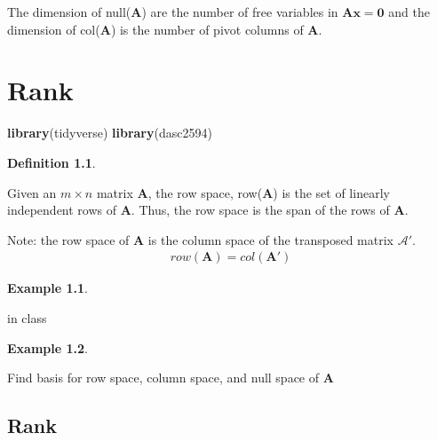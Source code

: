 \documentclass[
]{book}
\newenvironment{Shaded}{\begin{snugshade}}{\end{snugshade}}
\newcommand{\KeywordTok}[1]{\textcolor[rgb]{0.13,0.29,0.53}{\textbf{#1}}}
\newcommand{\NormalTok}[1]{#1}
\theoremstyle{definition}
\newtheorem{definition}{Definition}[chapter]
\theoremstyle{definition}
\newtheorem{example}{Example}[chapter]
\theoremstyle{definition}
\theoremstyle{remark}
\begin{document}
The dimension of null(\(\mathbf{A}\)) are the number of free variables in \(\mathbf{A}\mathbf{x} = \mathbf{0}\) and the dimension of col(\(\mathbf{A}\)) is the number of pivot columns of \(\mathbf{A}\).

\hypertarget{rank-1}{%
\chapter{Rank}\label{rank-1}}

\begin{Shaded}
\begin{Highlighting}[]
\KeywordTok{library}\NormalTok{(tidyverse)}
\KeywordTok{library}\NormalTok{(dasc2594)}
\end{Highlighting}
\end{Shaded}

\begin{definition}
\protect\hypertarget{def:unlabeled-div-150}{}\label{def:unlabeled-div-150}

Given an \(m \times n\) matrix \(\mathbf{A}\), the row space, row(\(\mathbf{A}\)) is the set of linearly independent rows of \(\mathbf{A}\). Thus, the row space is the span of the rows of \(\mathbf{A}\).

\end{definition}

Note: the row space of \(\mathbf{A}\) is the column space of the transposed matrix \(\mathcal{A}'\).
\[
\begin{aligned}
row(\mathbf{A}) = col(\mathbf{A}')
\end{aligned}
\]

\begin{example}
\protect\hypertarget{exm:unlabeled-div-151}{}\label{exm:unlabeled-div-151}

in class

\end{example}

\begin{example}
\protect\hypertarget{exm:unlabeled-div-152}{}\label{exm:unlabeled-div-152}

Find basis for row space, column space, and null space of \(\mathbf{A}\)

\end{example}

\hypertarget{rank-2}{%
\section{Rank}\label{rank-2}}
\end{document}
